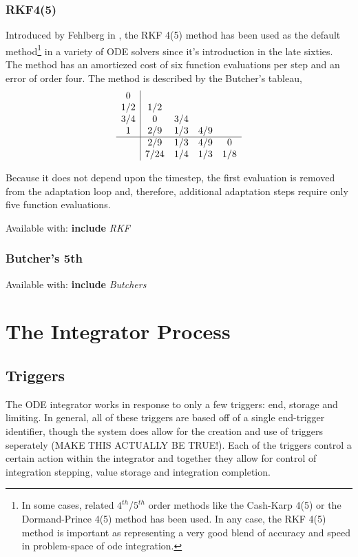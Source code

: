 \documentclass[letterpaper,10pt]{book}
\newcommand{\srcas}[1]{Available with: \textbf{include} \textlangle{}\textit{#1}\textrangle{}}
\begin{document}
      \subsection{RKF4(5)}
	Introduced by Fehlberg in \cite{fehlberg1969low}, the RKF 4(5) method has been used as the default method\footnote{In some cases, related $4^{th}$/$5^{th}$ order methods like the Cash-Karp 4(5) or the Dormand-Prince 4(5) method has been used.  In any case, the RKF 4(5) method is important as representing a very good blend of accuracy and speed in problem-space of ode integration.} in a variety of ODE solvers since it's introduction in the late sixties.  The method has an amortiezed cost of six function evaluations per step and an error of order four.  The method is described by the Butcher's tableau,
	\[
	  \begin{array}{c|cccc}
	    0 & & & &\\
	    1/2 & 1/2 & & &\\
	    3/4 & 0 & 3/4 & &\\	    
	    1 & 2/9 & 1/3 & 4/9 &\\	    
	    \hline
	    & 2/9 & 1/3 & 4/9 & 0\\
	    & 7/24 & 1/4 & 1/3 & 1/8\\
	  \end{array}
	\]
	
	Because it does not depend upon the timestep, the first evaluation is removed from the adaptation loop and, therefore, additional adaptation steps require only five function evaluations.
	
	\srcas{RKF}
    

      \subsection{Butcher's 5th}
	\srcas{Butchers}
    
    

  \chapter{The Integrator Process}
    
    \section{Triggers}
      The ODE integrator works in response to only a few triggers: end, storage and limiting.  In general, all of these triggers are based off of a single end-trigger identifier, though the system does allow for the creation and use of triggers seperately (MAKE THIS ACTUALLY BE TRUE!).  Each of the triggers control a certain action within the integrator and together they allow for control of integration stepping, value storage and integration completion.
      
\end{document}
